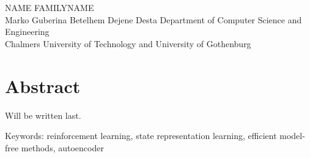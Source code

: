 \oneLineTitle\\
\oneLineSubtitle\\
NAME FAMILYNAME\\
Marko Guberina
Betelhem Dejene Desta
Department of Computer Science and Engineering\\
Chalmers University of Technology and University of Gothenburg\setlength{\parskip}{0.5cm}

\thispagestyle{plain}			%
\setlength{\parskip}{0pt plus 1.0pt}
\section*{Abstract}
Will be written last.

\vfill
Keywords: reinforcement learning, state representation learning, efficient model-free methods,
autoencoder


\newpage				%
\thispagestyle{empty}
\mbox{}

